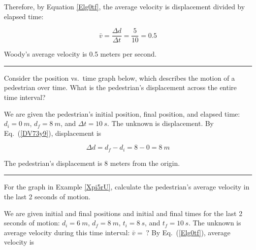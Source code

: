 \documentclass{article}
\begin{document}
Therefore, by Equation \eqref{Elg0tf}, the average velocity is displacement divided by elapsed time:

\begin{equation*}
    \bar{v} = \frac{\Delta d}{\Delta t} = \frac{5}{10} = 0.5
\end{equation*}

Woody's average velocity is 0.5 meters per second.

\hrule

\begin{example} \label{Xpi5rU}
Consider the position vs.~time graph below, which describes the motion of a pedestrian over time. What is the pedestrian's displacement across the entire time interval?
\end{example}

\begin{center}
\end{center}

 We are given the pedestrian's initial position, final position, and elapsed time: $d_i = \SI{0}{m}$, $d_f = \SI{8}{m}$, and $\Delta{t} = \SI{10}{s}$. The unknown is displacement. By Eq.~(\ref{DV73y9}), displacement is

\begin{equation*}
    \Delta d = d_f - d_i = 8 - 0 = \SI{+8}{m}
\end{equation*}

The pedestrian's displacement is 8 meters from the origin.

\hrule

\begin{example}
    For the graph in Example \ref{Xpi5rU}, calculate the pedestrian's average velocity in the last 2 seconds of motion.
\end{example}

 We are given initial and final positions and initial and final times for the last 2 seconds of motion: $d_i = \SI{6}{m}$, $d_f = \SI{8}{m}$, $t_i = \SI{8}{s}$, and $t_f = \SI{10}{s}$. The unknown is average velocity during this time interval: $\bar{v} =\ ?$ By Eq.~(\ref{Elg0tf}), average velocity is
\end{document}
